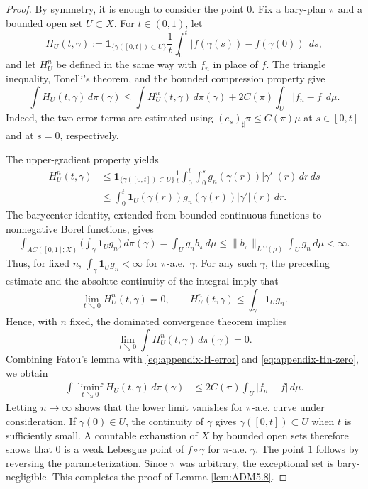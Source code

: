 \documentclass[11pt]{amsart}
\theoremstyle{definition}
\theoremstyle{remark}
\numberwithin{equation}{section}
\newcommand{\abs}[1]{|#1|}
\newcommand{\Norm}[2]{\|#1\|_{#2}}
\begin{document}
\begin{proof}
By symmetry, it is enough to consider the point $0$.  Fix a bary-plan
$\pi$ and a bounded open set $U\subset X$.  For $t\in(0,1)$, let
\begin{equation*}
 H_U(t,\gamma)
 :=\mathbf{1}_{\{\gamma([0,t])\subset U\}}\frac{1}{t}
   \int_0^t\abs{f(\gamma(s))-f(\gamma(0))}\,ds,
\end{equation*}
and let $H_U^n$ be defined in the same way with $f_n$ in place of $f$.
The triangle inequality, Tonelli's theorem, and the bounded compression
property give
\begin{equation}\label{eq:appendix-H-error}
 \int H_U(t,\gamma)\,d\pi(\gamma)
 \leq \int H_U^n(t,\gamma)\,d\pi(\gamma)
 +2C(\pi)\int_U\abs{f_n-f}\,d\mu.
\end{equation}
Indeed, the two error terms are estimated using
$(e_s)_\sharp\pi\leq C(\pi)\mu$ at $s\in[0,t]$ and at $s=0$,
respectively.

The upper-gradient property yields
\begin{align*}
 H_U^n(t,\gamma)
 &\leq \mathbf{1}_{\{\gamma([0,t])\subset U\}}\frac{1}{t}
 \int_0^t\int_0^s g_n(\gamma(r))\abs{\gamma'}(r)\,dr\,ds\\
 &\leq \int_0^t\mathbf{1}_U(\gamma(r))g_n(\gamma(r))
 \abs{\gamma'}(r)\,dr.
\end{align*}
The barycenter identity, extended from bounded continuous
functions to nonnegative Borel functions, gives
\begin{align*}
 \int_{AC([0,1];X)}
 \Big(\int_\gamma \mathbf{1}_U g_n\Big)\,d\pi(\gamma)
 =\int_U g_n b_\pi\,d\mu
 \leq \Norm{b_\pi}{L^\infty(\mu)}\int_Ug_n\,d\mu<\infty.
\end{align*}
Thus, for fixed $n$,
$\int_\gamma\mathbf{1}_Ug_n<\infty$ for $\pi$-a.e.\ $\gamma$.
For any such $\gamma$, the preceding estimate and the absolute
continuity of the integral imply that
\begin{equation*}
  \lim_{t\searrow 0}H_U^n(t,\gamma)=0,
  \qquad
  H_U^n(t,\gamma)\leq\int_\gamma\mathbf{1}_Ug_n.
\end{equation*}
Hence, with $n$ fixed, the dominated convergence theorem implies
\begin{equation}\label{eq:appendix-Hn-zero}
 \lim_{t\searrow 0}\int H_U^n(t,\gamma)\,d\pi(\gamma)=0.
\end{equation}
Combining Fatou's lemma with \eqref{eq:appendix-H-error} and
\eqref{eq:appendix-Hn-zero}, we obtain
\begin{align*}
 \int\liminf_{t\searrow 0}H_U(t,\gamma)\,d\pi(\gamma)
 &\leq 2C(\pi)\int_U\abs{f_n-f}\,d\mu.
\end{align*}
Letting $n\to\infty$ shows that the lower limit vanishes for
$\pi$-a.e. curve under consideration.  If $\gamma(0)\in U$, the continuity
of $\gamma$ gives $\gamma([0,t])\subset U$ when $t$ is sufficiently
small.  A countable exhaustion of $X$ by bounded open sets therefore
shows that $0$ is a weak Lebesgue point of $f\circ\gamma$ for
$\pi$-a.e. $\gamma$.  The point $1$ follows by reversing the
parameterization.  Since $\pi$ was arbitrary, the exceptional set is
bary-negligible. This completes the proof of Lemma \ref{lem:ADM5.8}.
\end{proof}
\end{document}
